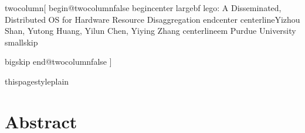 \documentclass[10pt,times,twocolumn]{z2-article}
\providecommand{\DIFaddtex}[1]{{\protect\color{blue}\uwave{#1}}} %
\providecommand{\DIFaddbegin}{} %
\providecommand{\DIFaddend}{} %
\providecommand{\DIFadd}[1]{\texorpdfstring{\DIFaddtex{#1}}{#1}} %
\newcommand{\DIFaddincludegraphics}[2][]{{\color{blue}\fbox{\DIFOincludegraphics[#1]{#2}}}} %
\DeclareRobustCommand{\DIFaddbegin}{\DIFOaddbegin \let\includegraphics\DIFaddincludegraphics} %
\DeclareRobustCommand{\DIFaddend}{\DIFOaddend \let\includegraphics\DIFOincludegraphics} %
\begin{document}
\pagestyle{plain}


%




\newcommand{\mm}{mm$^2$}
\newcommand{\figtitle}[1]{\textbf{#1}}
\newcommand{\us}{$\mu$s}
\newcommand{\yilun}[1]{{\color{green}\textbf{#1}}}

\newcommand{\laura}[1]{{\color{pink}\textbf{#1}}}
\newcommand{\arup}[1]{{\color{yellow}\textbf{#1}}}
\newcommand{\hungwei}[1]{{\color{purple}\textbf{#1}}}


\newcommand{\note}[2]{\fixme{$\ll$ #1 $\gg$ #2}}

\newcommand{\myitem}[1]{\item \textbf{#1}}

\newcommand{\yiying}[1]  {\noindent{\color{orange} {\bf \fbox{Yiying}     {\it#1}}}}
\newcommand{\yizhou}[1]  {\noindent{\color{blue} {\bf \fbox{Yizhou}     {\it#1}}}}

\newcommand{\fixme}[1]   {\noindent{\color{red} {\bf \fbox{FIXME}     {\it#1}}}}

twocolumn[
begin{@twocolumnfalse}
begin{center}
{largebf lego: A Disseminated, Distributed OS for Hardware Resource Disaggregation}
end{center}
\DIFaddbegin \DIFadd{vspace}{\DIFadd{-0.1in}}
\DIFaddend centerline{Yizhou Shan, Yutong Huang, Yilun Chen, Yiying Zhang}
centerline{em Purdue University}
smallskip

bigskip
end{@twocolumnfalse}
]

thispagestyle{plain}

\section*{Abstract}
\end{document}
